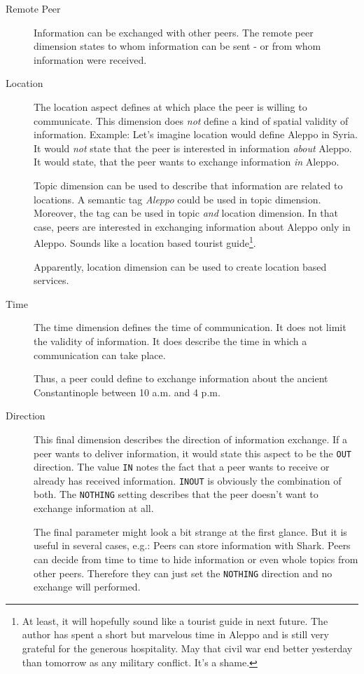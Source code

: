 \begin{description}
    \item[Remote Peer] Information can be exchanged with other peers. The remote peer dimension states to whom information can be sent - or from whom information were received.

    \item[Location]
The location aspect defines at which place the peer is willing to communicate. This dimension does {\it not} define a kind of spatial validity of information. Example: Let's imagine location would define Aleppo in Syria. It would {\it not} state that the peer is interested in information {\it about} Aleppo. It would state, that the peer wants to exchange information {\it in} Aleppo.

Topic dimension can be used to describe that information are related to locations. A semantic tag {\it Aleppo} could be used in topic dimension. Moreover, the tag can be used in topic {\it and} location dimension. In that case, peers are interested in exchanging information about Aleppo only in Aleppo. Sounds like a location based tourist guide\footnote{At least, it will hopefully sound like a tourist guide in next future. The author has spent a short but marvelous time in Aleppo and is still very grateful for the generous hospitality. May that civil war end better yesterday than tomorrow as any military conflict. It's a shame.}.

Apparently, location dimension can be used to create location based services.

    \item[Time]
The time dimension defines the time of communication. It does not limit the validity of information. It does describe the time in which a communication can take place.

Thus, a peer could define to exchange information about the ancient Constantinople between 10 a.m. and 4 p.m.

    \item[Direction]
This final dimension describes the direction of information exchange. If a peer wants to deliver information, it would state this aspect to be the {\tt OUT} direction. The value {\tt IN} notes the fact that a peer wants to receive or already has received information. {\tt INOUT} is obviously the combination of both. The {\tt NOTHING} setting describes that the peer doesn't want to exchange information at all.

The final parameter might look a bit strange at the first glance. But it is useful in several cases, e.g.: Peers can store information with Shark. Peers can decide from time to time to hide information or even whole topics from other peers. Therefore they can just set the {\tt NOTHING} direction and no exchange will performed.

\end{description}


